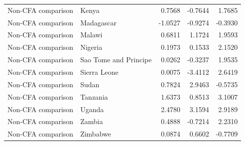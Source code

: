 \begin{table}
\begin{tabular}[t]{llrrr}
Non-CFA comparison & Kenya & 0.7568 & -0.7644 & 1.7685\\
\addlinespace
Non-CFA comparison & Madagascar & -1.0527 & -0.9274 & -0.3930\\
Non-CFA comparison & Malawi & 0.6811 & 1.1724 & 1.9593\\
Non-CFA comparison & Nigeria & 0.1973 & 0.1533 & 2.1520\\
Non-CFA comparison & Sao Tome and Principe & 0.0262 & -0.3237 & 1.9535\\
Non-CFA comparison & Sierra Leone & 0.0075 & -3.4112 & 2.6419\\
\addlinespace
Non-CFA comparison & Sudan & 0.7824 & 2.9463 & -0.5735\\
Non-CFA comparison & Tanzania & 1.6373 & 0.8513 & 3.1007\\
Non-CFA comparison & Uganda & 2.4780 & 3.1594 & 2.9189\\
Non-CFA comparison & Zambia & 0.4888 & -0.7214 & 2.2310\\
Non-CFA comparison & Zimbabwe & 0.0874 & 0.6602 & -0.7709\\
\bottomrule
\end{tabular}
\end{table}